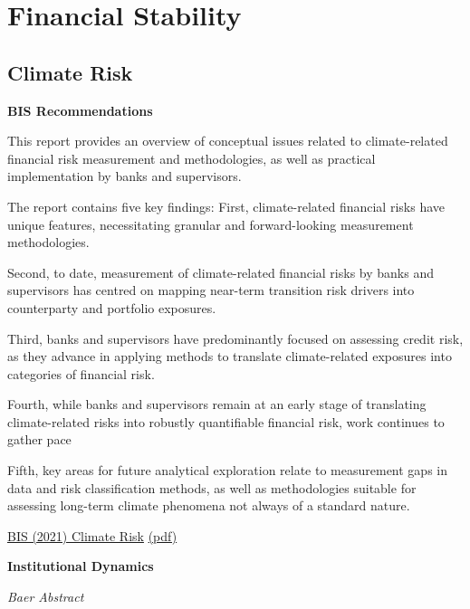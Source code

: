 \documentclass[
]{book}
\begin{document}
\hypertarget{financial-stability-1}{%
\section{Financial Stability}\label{financial-stability-1}}

\hypertarget{climate-risk-1}{%
\subsection{Climate Risk}\label{climate-risk-1}}

\textbf{BIS Recommendations}

This report provides an overview of conceptual issues related to climate-related financial risk
measurement and methodologies, as well as practical implementation by banks and supervisors.

The report contains five key findings:
First, climate-related financial risks have unique features, necessitating granular and
forward-looking measurement methodologies.

Second, to date, measurement of climate-related financial risks by banks and supervisors
has centred on mapping near-term transition risk drivers into counterparty and portfolio exposures.

Third, banks and supervisors have predominantly focused on assessing credit risk, as they
advance in applying methods to translate climate-related exposures into categories of financial risk.

Fourth, while banks and supervisors remain at an early stage of translating climate-related
risks into robustly quantifiable financial risk, work continues to gather pace

Fifth, key areas for future analytical exploration relate to measurement gaps in data and
risk classification methods, as well as methodologies suitable for assessing long-term climate
phenomena not always of a standard nature.

\href{https://www.bis.org/bcbs/publ/d518.htm}{BIS (2021) Climate Risk}
\href{pdf/BIS_2021_Climate_Risk.pdf}{(pdf)}

\textbf{Institutional Dynamics}

\emph{Baer Abstract}
\end{document}
